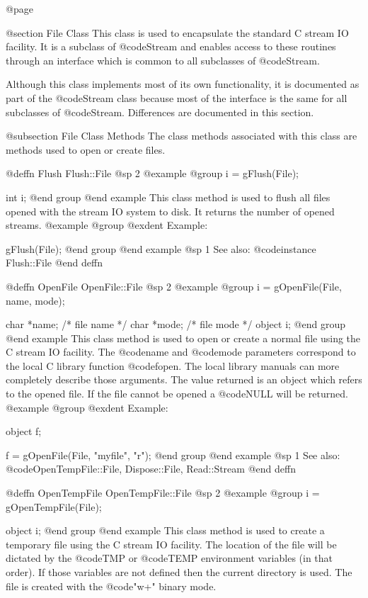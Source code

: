 @page

@section File Class
This class is used to encapsulate the standard C stream IO facility.  It
is a subclass of @code{Stream} and enables access to these routines
through an interface which is common to all subclasses of @code{Stream}.

Although this class implements most of its own functionality, it is
documented as part of the @code{Stream} class because most of the
interface is the same for all subclasses of @code{Stream}.  Differences
are documented in this section.


@subsection File Class Methods
The class methods associated with this class are methods used to
open or create files.




@deffn {Flush} Flush::File
@sp 2
@example
@group
i = gFlush(File);

int  i;
@end group
@end example
This class method is used to flush all files opened with the
stream IO system to disk.  It returns the number of opened
streams.
@example
@group
@exdent Example:

gFlush(File);
@end group
@end example
@sp 1
See also:  @code{instance Flush::File}
@end deffn







@deffn {OpenFile} OpenFile::File
@sp 2
@example
@group
i = gOpenFile(File, name, mode);

char    *name;  /*  file name  */
char    *mode;  /*  file mode  */
object  i;
@end group
@end example
This class method is used to open or create a normal file using the
C stream IO facility.  The @code{name} and @code{mode} parameters
correspond to the local C library function @code{fopen}.  The
local library manuals can more completely describe those arguments.
The value returned is an object which refers to the opened file.
If the file cannot be opened a @code{NULL} will be returned.
@example
@group
@exdent Example:

object  f;

f = gOpenFile(File, "myfile", "r");
@end group
@end example
@sp 1
See also:  @code{OpenTempFile::File, Dispose::File, Read::Stream}
@end deffn





@deffn {OpenTempFile} OpenTempFile::File
@sp 2
@example
@group
i = gOpenTempFile(File);

object  i;
@end group
@end example
This class method is used to create a temporary file using the C stream
IO facility.  The location of the file will be dictated by the
@code{TMP} or @code{TEMP} environment variables (in that order).  If
those variables are not defined then the current directory is used.  The
file is created with the @code{"w+"} binary mode.

